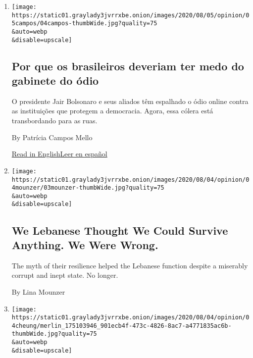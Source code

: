 \begin{enumerate}
\def\labelenumi{\arabic{enumi}.}
\item
  \href{/pt/2020/08/04/opinion/international-world/bolsonaro-gabinete-do-odio.html}{}

  \texttt{[image: https://static01.graylady3jvrrxbe.onion/images/2020/08/05/opinion/05campos/04campos-thumbWide.jpg?quality=75\\\&auto=webp\\\&disable=upscale]}

  \hypertarget{por-que-os-brasileiros-deveriam-ter-medo-do-gabinete-do-uxf3dio}{%
  \subsection{Por que os brasileiros deveriam ter medo do gabinete do
  ódio}\label{por-que-os-brasileiros-deveriam-ter-medo-do-gabinete-do-uxf3dio}}

  O presidente Jair Bolsonaro e seus aliados têm espalhado o ódio online
  contra as instituições que protegem a democracia. Agora, essa cólera
  está transbordando para as ruas.

  By Patrícia Campos Mello

  \href{https://www.nytimes3xbfgragh.onion/2020/08/04/opinion/bolsonaro-office-of-hate-brazil.html}{Read
  in
  English}\href{https://www.nytimes3xbfgragh.onion/es/2020/08/04/espanol/opinion/bolsonaro-oficina-odio-brasil.html}{Leer
  en español}
\item
  \href{/2020/08/03/opinion/lebanon-coronavirus-economy.html}{}

  \texttt{[image: https://static01.graylady3jvrrxbe.onion/images/2020/08/04/opinion/04mounzer/03mounzer-thumbWide.jpg?quality=75\\\&auto=webp\\\&disable=upscale]}

  \hypertarget{we-lebanese-thought-we-could-survive-anything-we-were-wrong}{%
  \subsection{We Lebanese Thought We Could Survive Anything. We Were
  Wrong.}\label{we-lebanese-thought-we-could-survive-anything-we-were-wrong}}

  The myth of their resilience helped the Lebanese function despite a
  miserably corrupt and inept state. No longer.

  By Lina Mounzer
\item
  \href{/2020/08/02/opinion/hong-kong-election-china.html}{}

  \texttt{[image: https://static01.graylady3jvrrxbe.onion/images/2020/08/04/opinion/04cheung/merlin\_175103946\_901ecb4f-473c-4826-8ac7-a4771835ac6b-thumbWide.jpg?quality=75\\\&auto=webp\\\&disable=upscale]}


\end{enumerate}
